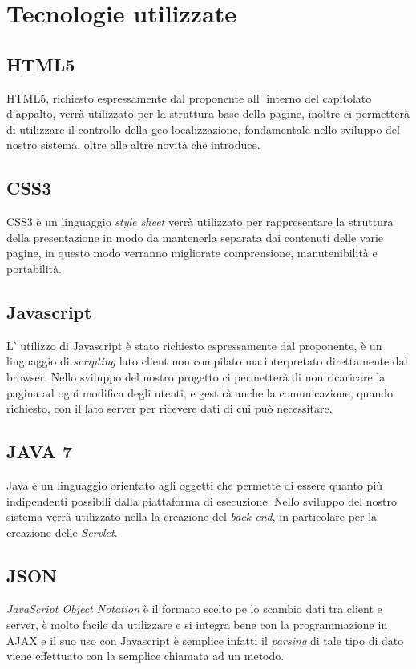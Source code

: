 \appendix
\section{Tecnologie utilizzate}
\subsection{HTML5}
HTML5, richiesto espressamente dal proponente all' interno del capitolato d'appalto, verrà utilizzato per la struttura base della pagine, inoltre ci permetterà di utilizzare il controllo della geo localizzazione, fondamentale nello sviluppo del nostro sistema, oltre alle altre novità che introduce.
\subsection{CSS3}
CSS3 è un linguaggio \textit{style sheet} verrà utilizzato per rappresentare la struttura della presentazione in modo da mantenerla separata dai contenuti delle varie pagine, in questo modo verranno migliorate comprensione, manutenibilità e portabilità.
\subsection{Javascript}
L' utilizzo di Javascript è stato richiesto espressamente dal proponente, è un linguaggio di \textit{scripting} lato client non compilato ma interpretato direttamente dal browser. Nello sviluppo del nostro progetto ci permetterà di non ricaricare la pagina ad ogni modifica degli utenti, e gestirà anche la comunicazione, quando richiesto, con il lato server per ricevere dati di cui può necessitare.
\subsection{JAVA 7}
Java è un linguaggio orientato agli oggetti che permette di essere quanto più indipendenti possibili dalla piattaforma di esecuzione. Nello sviluppo del nostro sistema verrà utilizzato nella la creazione del \textit{back end}, in particolare per la creazione delle \textit{Servlet}.
\subsection{JSON}
\textit{JavaScript Object Notation} è il formato scelto pe lo scambio dati tra client e server, è molto facile da utilizzare e si integra bene con la programmazione in AJAX e il suo uso con Javascript è semplice infatti il \textit{parsing} di tale tipo di dato viene effettuato con la semplice chiamata ad un metodo.

